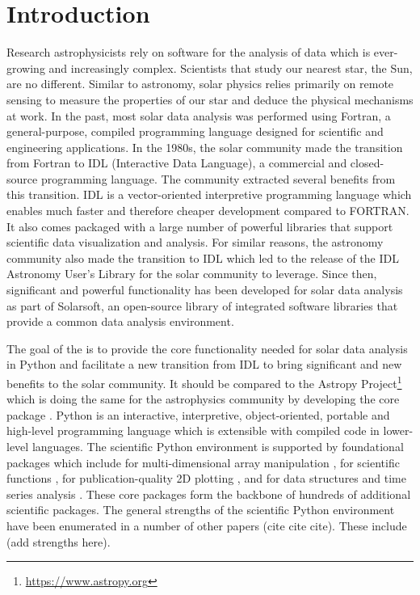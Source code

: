 \section{Introduction}
\label{sec:intro}

Research astrophysicists rely on software for the analysis of data which is ever-growing and increasingly complex.
Scientists that study our nearest star, the Sun, are no different.
Similar to astronomy, solar physics relies primarily on remote sensing to measure the properties of our star and deduce the physical mechanisms at work.
In the past, most solar data analysis was performed using Fortran, a general-purpose, compiled programming language designed for scientific and engineering applications.
In the 1980s, the solar community made the transition from Fortran to IDL (Interactive Data Language), a commercial and closed-source programming language.
The community extracted several benefits from this transition.
IDL is a vector-oriented interpretive programming language which enables much faster and therefore cheaper development compared to FORTRAN.
It also comes packaged with a large number of powerful libraries that support scientific data visualization and analysis.
For similar reasons, the astronomy community also made the transition to IDL which led to the release of the IDL Astronomy User's Library for the solar community to leverage.
Since then, significant and powerful functionality has been developed for solar data analysis as part of Solarsoft, an open-source library of integrated software libraries that provide a common data analysis environment\citet{freeland1998}.

The goal of the \sunpyproj is to provide the core functionality needed for solar data analysis in Python and facilitate a new transition from IDL to bring significant and new benefits to the solar community.
It should be compared to the Astropy Project\footnote{\url{https://www.astropy.org}} which is doing the same for the astrophysics community by developing the \astropypkg core package \citep{astropy2018}.
Python is an interactive, interpretive, object-oriented, portable and high-level programming language which is extensible with compiled code in lower-level languages.
The scientific Python environment is supported by foundational packages which include \numpy for multi-dimensional array manipulation \citep{numpy}, \scipy for scientific functions \citep{scipy}, \matplotlib for publication-quality 2D plotting \citep{matplotlib}, and \pandas for data structures and time series analysis \citep{pandas}.
These core packages form the backbone of hundreds of additional scientific \python packages.
The general strengths of the scientific Python environment have been enumerated in a number of other papers (cite cite cite). These include (add strengths here).

